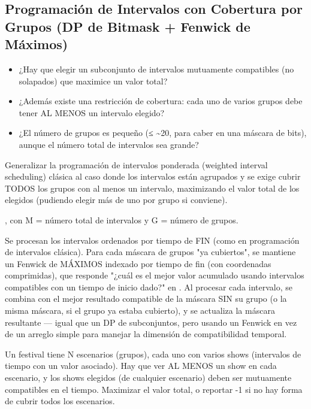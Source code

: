 \subsection{Programación de Intervalos con Cobertura por Grupos (DP de Bitmask + Fenwick de Máximos)}


\begin{itemize}
\item ¿Hay que elegir un subconjunto de intervalos mutuamente compatibles (no solapados) que maximice un valor total?
\item ¿Además existe una restricción de cobertura: cada uno de varios grupos debe tener AL MENOS un intervalo elegido?
\item ¿El número de grupos es pequeño (≤ \textasciitilde{}20, para caber en una máscara de bits), aunque el número total de intervalos sea grande?
\end{itemize}

 Generalizar la programación de intervalos ponderada (weighted interval scheduling) clásica al caso donde los intervalos están agrupados y se exige cubrir TODOS los grupos con al menos un intervalo, maximizando el valor total de los elegidos (pudiendo elegir más de uno por grupo si conviene).

 , con M = número total de intervalos y G = número de grupos.

 Se procesan los intervalos ordenados por tiempo de FIN (como en programación de intervalos clásica). Para cada máscara de grupos "ya cubiertos", se mantiene un Fenwick de MÁXIMOS indexado por tiempo de fin (con coordenadas comprimidas), que responde "¿cuál es el mejor valor acumulado usando intervalos compatibles con un tiempo de inicio dado?" en . Al procesar cada intervalo, se combina con el mejor resultado compatible de la máscara SIN su grupo (o la misma máscara, si el grupo ya estaba cubierto), y se actualiza la máscara resultante — igual que un DP de subconjuntos, pero usando un Fenwick en vez de un arreglo simple para manejar la dimensión de compatibilidad temporal.


Un festival tiene N escenarios (grupos), cada uno con varios shows (intervalos de tiempo con un valor asociado). Hay que ver AL MENOS un show en cada escenario, y los shows elegidos (de cualquier escenario) deben ser mutuamente compatibles en el tiempo. Maximizar el valor total, o reportar -1 si no hay forma de cubrir todos los escenarios.

